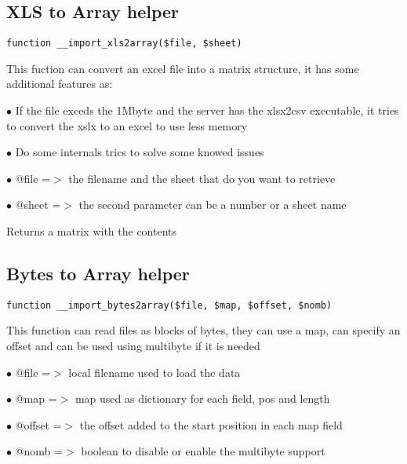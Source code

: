 \documentclass[a4paper]{book}
\begin{document}
\hypertarget{toc164}{}
\subsection{XLS to Array helper}

\begin{lstlisting}
function __import_xls2array($file, $sheet)
\end{lstlisting}

This fuction can convert an excel file into a matrix structure, it has some additional features as:

\begin{compactitem}
\item[\color{myblue}$\bullet$] If the file exceds the 1Mbyte and the server has the xlsx2csv executable, it tries to convert the xslx
  to an excel to use less memory
\item[\color{myblue}$\bullet$] Do some internals trics to solve some knowed issues
\end{compactitem}

\begin{compactitem}
\item[\color{myblue}$\bullet$] @file  =$>$ the filename and the sheet that do you want to retrieve
\item[\color{myblue}$\bullet$] @sheet =$>$ the second parameter can be a number or a sheet name
\end{compactitem}

Returns a matrix with the contents

\hypertarget{toc165}{}
\subsection{Bytes to Array helper}

\begin{lstlisting}
function __import_bytes2array($file, $map, $offset, $nomb)
\end{lstlisting}

This function can read files as blocks of bytes, they can use a map, can specify
an offset and can be used using multibyte if it is needed

\begin{compactitem}
\item[\color{myblue}$\bullet$] @file   =$>$ local filename used to load the data
\item[\color{myblue}$\bullet$] @map    =$>$ map used as dictionary for each field, pos and length
\item[\color{myblue}$\bullet$] @offset =$>$ the offset added to the start position in each map field
\item[\color{myblue}$\bullet$] @nomb   =$>$ boolean to disable or enable the multibyte support
\end{compactitem}
\end{document}
